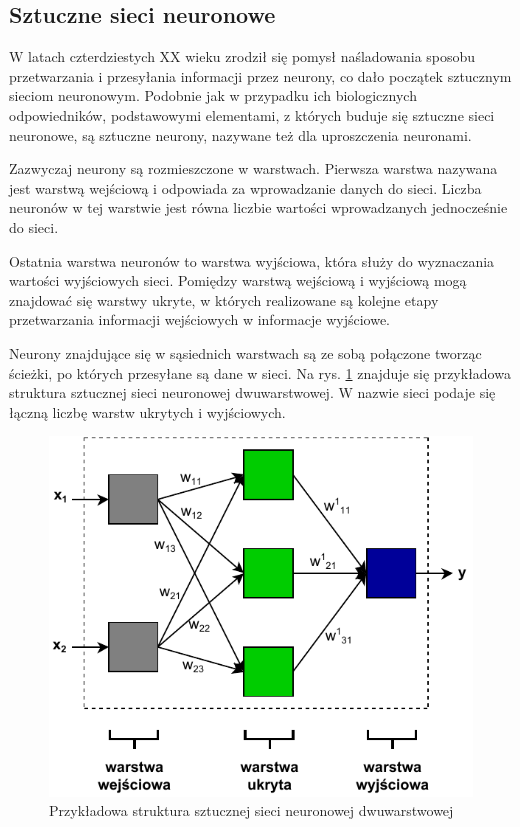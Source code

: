\subsection{Sztuczne sieci neuronowe}
W latach czterdziestych XX wieku zrodził się pomysł naśladowania sposobu przetwarzania i przesyłania informacji przez neurony, co dało początek sztucznym sieciom neuronowym. Podobnie jak w przypadku ich biologicznych odpowiedników, podstawowymi elementami, z których buduje się sztuczne sieci neuronowe, są sztuczne neurony, nazywane też dla uproszczenia neuronami.

Zazwyczaj neurony są rozmieszczone w warstwach. Pierwsza warstwa nazywana jest warstwą wejściową i odpowiada za wprowadzanie danych do sieci. Liczba neuronów w tej warstwie jest równa liczbie wartości wprowadzanych jednocześnie do sieci.

Ostatnia warstwa neuronów to warstwa wyjściowa, która służy do wyznaczania wartości wyjściowych sieci. Pomiędzy warstwą wejściową i wyjściową mogą znajdować się warstwy ukryte, w których realizowane są kolejne etapy przetwarzania informacji wejściowych w informacje wyjściowe.

Neurony znajdujące się w sąsiednich warstwach są ze sobą połączone tworząc ścieżki, po których przesyłane są dane w sieci. Na rys. \ref{fig:ssn-przykladowa-siec} znajduje się przykładowa struktura sztucznej sieci neuronowej dwuwarstwowej. W nazwie sieci podaje się łączną liczbę warstw ukrytych i wyjściowych. 

\begin{figure}[h]
	\centering
	\includegraphics[scale=1.0]{graphics/01_podstawy_teoretyczne/ssn-przykladowa-siec.pdf}
	\caption{ Przykładowa struktura sztucznej sieci neuronowej dwuwarstwowej }
	\label{fig:ssn-przykladowa-siec}
\end{figure}

